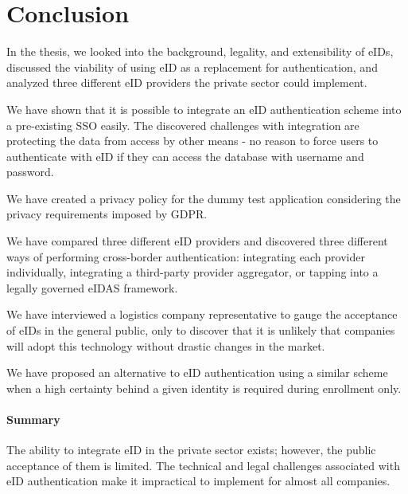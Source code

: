 \section{Conclusion}

In the thesis, we looked into the background, legality, and extensibility of eIDs, discussed the viability of using eID as a replacement for authentication, and analyzed three different eID providers the private sector could implement.

We have shown that it is possible to integrate an eID authentication scheme into a pre-existing SSO easily. The discovered challenges with integration are protecting the data from access by other means - no reason to force users to authenticate with eID if they can access the database with {username and password}.

We have created a privacy policy for the dummy test application considering the privacy requirements imposed by GDPR.

We have compared three different eID providers and discovered three different ways of performing cross-border authentication: integrating each provider individually, integrating a third-party provider aggregator, or tapping into a legally governed eIDAS framework.

We have interviewed a logistics company representative to gauge the acceptance of eIDs in the general public, only to discover that it is unlikely that companies will adopt this technology without drastic changes in the market.

We have proposed an alternative to eID authentication using a similar scheme when a high certainty behind a given identity is required during enrollment only.

\paragraph{Summary} The ability to integrate eID in the private sector exists; however, the public acceptance of them is limited. The technical and legal challenges associated with eID authentication make it impractical to implement for almost all companies.